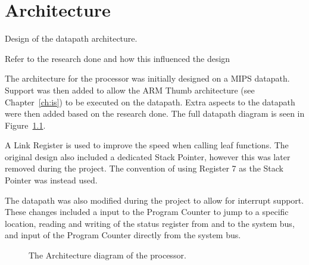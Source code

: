 

\chapter{Architecture}


Design of the datapath architecture.

Refer to the research done and how this influenced the design

The architecture for the processor was initially designed on a MIPS datapath.
Support was then added to allow the ARM Thumb architecture (see Chapter~\ref{ch:is}) to be executed on the datapath.
Extra aspects to the datapath were then added based on the research done. 
The full datapath diagram is seen in Figure~\ref{fig:architecture}.

A Link Register is used to improve the speed when calling leaf functions.
The original design also included a dedicated Stack Pointer, however this was later removed during the project.
The convention of using Register 7 as the Stack Pointer was instead used. 

The datapath was also modified during the project to allow for interrupt support.
These changes included a input to the Program Counter to jump to a specific location, reading and writing of the status register from and to the system bus, and input of the Program Counter directly from the system bus. 


\begin{figure}
\vspace*{-1.5in}
\caption{The Architecture diagram of the processor.}
\label{fig:architecture}
\end{figure}

